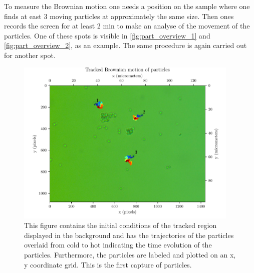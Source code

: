 \documentclass[12pt,english]{scrartcl}
\begin{document}
To measure the Brownian motion one needs a position on the sample where one
finds at east 3 moving particles at approximately the same size. Then ones
records the screen for at least 2 min to make an analyse of the movement of the
particles. One of these spots is visible in \autoref{fig:part_overview_1} and
\autoref{fig:part_overview_2}, as an example. The same procedure is again
carried out for another spot.

\begin{figure}[H]
	\centering
	\includegraphics[width=0.95\textwidth]{figures/I1_tracked.pdf}
	\caption[Capture 1 of particles]{This figure contains the initial conditions of the
		tracked region displayed in the background and has the trajectories of the
		particles overlaid from cold to hot indicating the time evolution of the
		particles. Furthermore, the particles are labeled and plotted on an x, y
		coordinate grid. This is the first capture of particles.
	}\label{fig:part_overview_1}
\end{figure}
\end{document}
